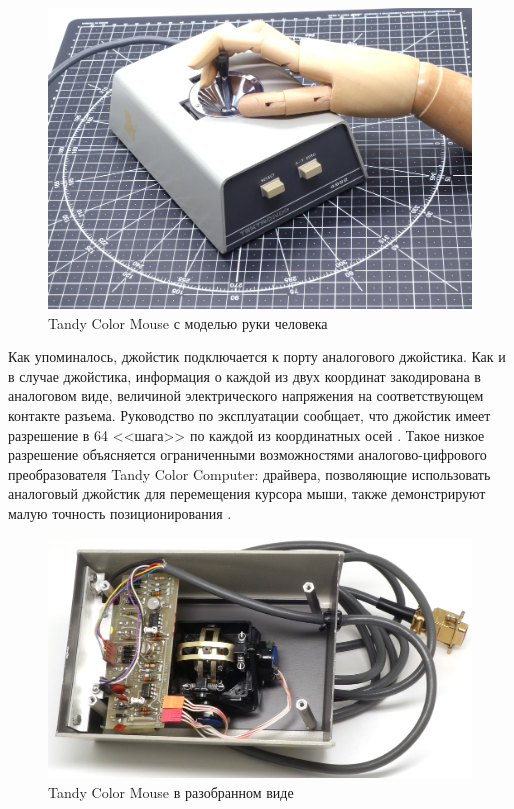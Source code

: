 \documentclass[11pt, a4paper]{article}
\begin{document}
\begin{figure}[h]
    \centering
    \includegraphics[scale=0.55]{1975_Tektronix_4952_Joystick/hand_30.jpg}
    \caption{Tandy Color Mouse с моделью руки человека}
    \label{fig:TektronixJoystickHand}
\end{figure}

Как упоминалось, джойстик подключается к порту аналогового джойстика. Как и в случае джойстика, информация о каждой из двух координат закодирована в аналоговом виде, величиной электрического напряжения на соответствующем контакте разъема. Руководство по эксплуатации сообщает, что джойстик имеет разрешение в 64 <<шага>> по каждой из координатных осей \cite{manual}. Такое низкое разрешение объясняется ограниченными возможностями аналогово-цифрового преобразователя Tandy Color Computer: драйвера, позволяющие использовать аналоговый джойстик для перемещения курсора мыши, также демонстрируют малую точность позиционирования \cite{hierophant}.

\begin{figure}[h]
    \centering
    \includegraphics[scale=0.8]{1975_Tektronix_4952_Joystick/inside_30.jpg}
    \caption{Tandy Color Mouse в разобранном виде}
    \label{fig:TektronixJoystickInside}
\end{figure}
\end{document}
